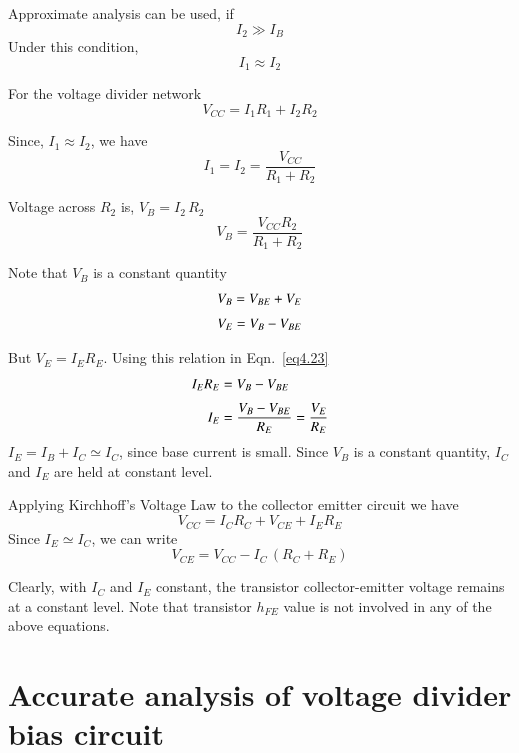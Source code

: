 Approximate analysis can be used, if
\begin{equation}
I_{2} \gg I_{B}\label{eq4.19}
\end{equation}
Under this condition, 
\begin{equation}
I_{1}\approx I_{2}\label{eq4.20}
\end{equation}

For the voltage divider network
$$
V_{CC}=I_{1}R_{1}+I_{2}R_{2}
$$

Since, $I_{1}\approx I_{2}$, we have
\begin{equation}
I_{1}=I_{2}=\frac{V_{CC}}{R_{1}+R_{2}}\label{eq4.21}
\end{equation}

Voltage across $R_{2}$ is, $V_{B}=I_{2}\,R_{2}$
\begin{equation}
V_{B}=\frac{V_{CC}R_{2}}{R_{1}+R_{2}}\label{eq4.22}
\end{equation}

Note that $V_{B}$ is a constant quantity
\begin{align}
& V_{B}=V_{BE}+V_{E}\notag\\[3pt]
& V_{E}=V_{B}-V_{BE}\label{eq4.23}
\end{align}

But $V_{E}=I_{E}R_{E}$. Using this relation in Eqn.~\eqref{eq4.23}
\begin{align}
I_{E}R_{E} &= V_{B}-V_{BE}\notag\\[3pt]
I_{E} &= \frac{V_{B}-V_{BE}}{R_{E}}=\frac{V_{E}}{R_{E}}\label{eq4.24}
\end{align}
$I_{E}=I_{B}+I_{C}\simeq I_{C}$, since base current is small. Since $V_{B}$ is a constant quantity, $I_{C}$ and $I_{E}$ are held at constant level.

Applying Kirchhoff's Voltage Law to the collector emitter circuit we have
$$
V_{CC}=I_{C}R_{C}+V_{CE}+I_{E}R_{E}
$$
Since $I_{E}\simeq I_{C}$, we can write
\begin{equation}
V_{CE}=V_{CC}-I_{C}\,(R_{C}+R_{E})\label{eq4.25}
\end{equation}

Clearly, with $I_{C}$ and $I_{E}$ constant, the transistor collector-emitter voltage remains at a constant level. Note that transistor $h_{FE}$ value is not involved in any of the above equations.

\section{Accurate analysis of voltage divider bias circuit}\label{sec4.8}

